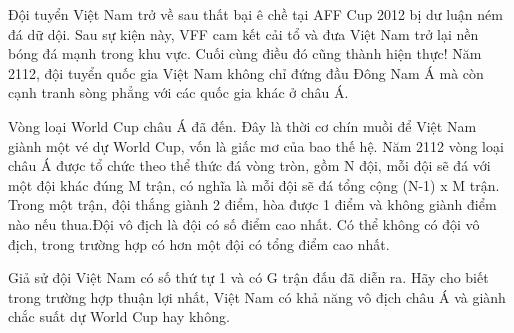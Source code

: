 \textbf{}   Đội tuyển Việt Nam trở về sau thất bại ê chề tại AFF Cup 2012 bị dư luận ném đá dữ dội. Sau sự kiện này, VFF cam kết cải tổ và đưa Việt Nam trở lại nền bóng đá mạnh trong khu vực. Cuối cùng điều đó cũng thành hiện thực! Năm 2112, đội tuyển quốc gia Việt Nam không chỉ đứng đầu Đông Nam Á mà còn cạnh tranh sòng phẳng với các quốc gia khác ở châu Á.  

   Vòng loại World Cup châu Á đã đến. Đây là thời cơ chín muồi để Việt Nam giành một vé dự World Cup, vốn là giấc mơ của bao thế hệ. Năm 2112 vòng loại châu Á được tổ chức theo thể thức đá vòng tròn, gồm N đội, mỗi đội sẽ đá với một đội khác đúng M trận, có nghĩa là mỗi đội sẽ đá tổng cộng (N-1) x M trận. Trong một trận, đội thắng giành 2 điểm, hòa được 1 điểm và không giành điểm nào nếu thua.Đội vô địch là đội có số điểm cao nhất. Có thể không có đội vô địch, trong trường hợp có hơn một đội có tổng điểm cao nhất.  

   Giả sử đội Việt Nam có số thứ tự 1 và có G trận đấu đã diễn ra. Hãy cho biết trong trường hợp thuận lợi nhất, Việt Nam có khả năng vô địch châu Á và giành chắc suất dự World Cup hay không.